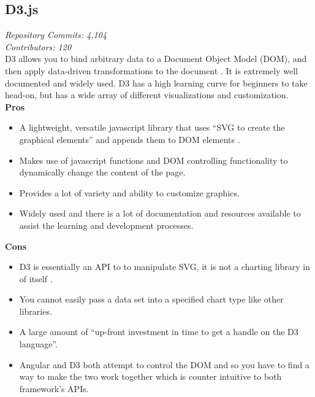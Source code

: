 \documentclass[onecolumn, draftclsnofoot,10pt, compsoc]{IEEEtran}
\begin{document}
\subsection{D3.js}
\textit{Repository Commits: 4,104}\\  
\textit{Contributors: 120}\\
D3 allows you to bind arbitrary data to a Document Object Model (DOM), and then apply data-driven transformations to the document \cite{d3_home}. It is extremely well documented and widely used. D3 has a high learning curve for beginners to take head-on, but has a wide array of different visualizations and customization.\\
\textbf{Pros}
\begin{itemize}
\item A lightweight, versatile javascript library that uses ``SVG to create the graphical elements'' and appends them to DOM elements \cite{Schwartz}. 
\item Makes use of javascript functions and DOM controlling functionality to dynamically change the content of the page. 
\item Provides a lot of variety and ability to customize graphics.
\item Widely used and there is a lot of documentation and resources available to assist the learning and development processes.
\end{itemize}
\textbf{Cons}
\begin{itemize}
\item D3 is essentially an API to to manipulate SVG, it is not a charting library in of itself \cite{Sun}.
\item You cannot easily pass a data set into a specified chart type like other libraries.
\item A large amount of ``up-front investment in time to get a handle on the D3 language''\cite{Jacobson}.
\item Angular and D3 both attempt to control the DOM and so you have to find a way to make the two work together which is counter intuitive to both framework's APIs. 
\end{itemize}
\end{document}
